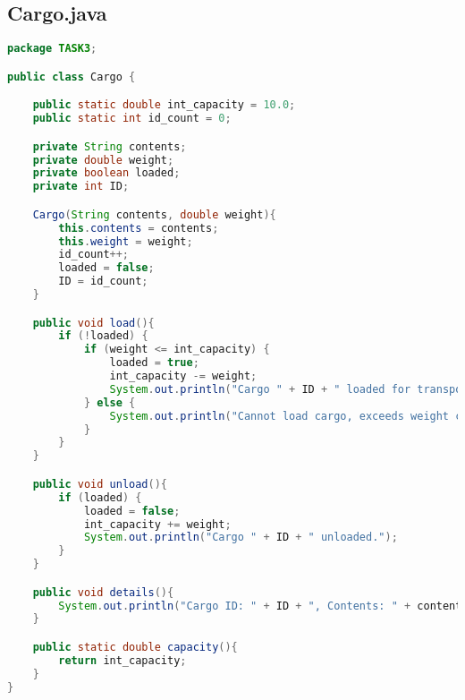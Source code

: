 \documentclass[11pt,a4paper]{article}
\begin{document}
\subsection*{Cargo.java}
\begin{lstlisting}[style=codestyle,language=Java]
package TASK3;

public class Cargo {

    public static double int_capacity = 10.0;   
    public static int id_count = 0;

    private String contents;
    private double weight;
    private boolean loaded;
    private int ID;

    Cargo(String contents, double weight){
        this.contents = contents;
        this.weight = weight;
        id_count++;
        loaded = false;
        ID = id_count;
    }

    public void load(){
        if (!loaded) { 
            if (weight <= int_capacity) { 
                loaded = true;
                int_capacity -= weight;
                System.out.println("Cargo " + ID + " loaded for transport.");
            } else {
                System.out.println("Cannot load cargo, exceeds weight capacity.");
            }
        }
    }

    public void unload(){
        if (loaded) {  
            loaded = false;
            int_capacity += weight;
            System.out.println("Cargo " + ID + " unloaded.");
        }
    }

    public void details(){
        System.out.println("Cargo ID: " + ID + ", Contents: " + contents + ", Weight: " + weight + ", Loaded: " + loaded);
    }

    public static double capacity(){ 
        return int_capacity;
    }
}
\end{lstlisting}
\end{document}
